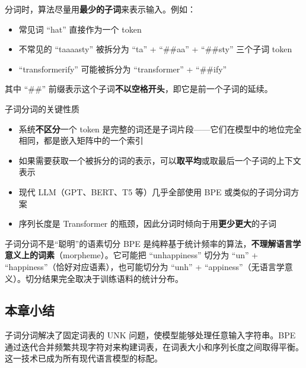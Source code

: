\documentclass[a4paper]{article}
\begin{document}



分词时，算法尽量用\textbf{最少的子词}来表示输入。例如：
\begin{itemize}
    \item 常见词 ``hat'' 直接作为一个 token
    \item 不常见的 ``taaaasty'' 被拆分为 ``ta'' + ``\#\#aa'' + ``\#\#sty'' 三个子词 token
    \item ``transformerify'' 可能被拆分为 ``transformer'' + ``\#\#ify''
\end{itemize}

其中 ``\#\#'' 前缀表示这个子词\textbf{不以空格开头}，即它是前一个子词的延续。





\begin{knowledgebox}{子词分词的关键性质}
\begin{itemize}
    \item 系统\textbf{不区分}一个 token 是完整的词还是子词片段——它们在模型中的地位完全相同，都是嵌入矩阵中的一个索引
    \item 如果需要获取一个被拆分的词的表示，可以\textbf{取平均}或取最后一个子词的上下文表示
    \item 现代 LLM（GPT、BERT、T5 等）几乎全部使用 BPE 或类似的子词分词方案
    \item 序列长度是 Transformer 的瓶颈，因此分词时倾向于用\textbf{更少更大}的子词
\end{itemize}
\end{knowledgebox}

\begin{warningbox}{子词分词不是``聪明''的语素切分}
BPE 是纯粹基于统计频率的算法，\textbf{不理解语言学意义上的词素}（morpheme）。它可能把 ``unhappiness'' 切分为 ``un'' + ``happiness''（恰好对应语素），也可能切分为 ``unh'' + ``appiness''（无语言学意义）。切分结果完全取决于训练语料的统计分布。
\end{warningbox}

\subsection{本章小结}

子词分词解决了固定词表的 UNK 问题，使模型能够处理任意输入字符串。BPE 通过迭代合并频繁共现字符对来构建词表，在词表大小和序列长度之间取得平衡。这一技术已成为所有现代语言模型的标配。
\end{document}
